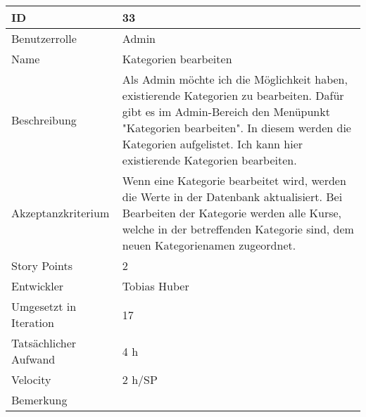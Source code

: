 \begin{tabularx}{\textwidth}{|p{}|X|}
	\hline
	ID & 33 \\
	\hline
	Benutzerrolle & Admin \\
	\hline
	Name & Kategorien bearbeiten\\
	\hline
	Beschreibung & Als Admin möchte ich die Möglichkeit haben, existierende Kategorien zu bearbeiten. Dafür gibt es im Admin-Bereich den Menüpunkt "Kategorien bearbeiten". In diesem werden die Kategorien aufgelistet. Ich kann hier existierende Kategorien bearbeiten. \\
	\hline
	Akzeptanzkriterium & Wenn eine Kategorie bearbeitet wird, werden die Werte in der Datenbank aktualisiert. Bei Bearbeiten der Kategorie werden alle Kurse, welche in der betreffenden Kategorie sind, dem neuen Kategorienamen zugeordnet. \\
	\hline
	Story Points & 2 \\
	\hline
	Entwickler &  Tobias Huber\\
	\hline
	Umgesetzt in Iteration & 17\\
	\hline
	Tatsächlicher Aufwand & 4 h\\
	\hline
	Velocity & 2 h/SP\\
	\hline
	Bemerkung & \\
	\hline
\end{tabularx}
\vspace{20pt}
